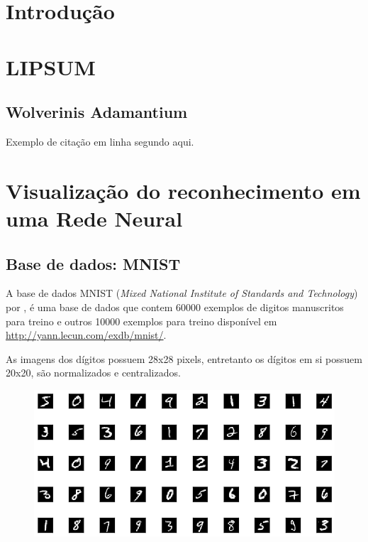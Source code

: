 \documentclass[
	12pt,				%
	oneside,			%
	a4paper,			%
	english,			%
	french,				%
	spanish,			%
	brazil,				%
	]{abntex2}
\begin{document}
\chapter[Introdução]{Introdução}

\par \lipsum[50]

\chapter{LIPSUM}
\section{Wolverinis Adamantium}
\par \lipsum[30] \cite{deeplearning_net_mlp}

\par Exemplo de citação em linha segundo  aqui.

\chapter{Visualização do reconhecimento em uma Rede Neural}
\section{Base de dados: MNIST}

\par A base de dados MNIST (\textit{Mixed National Institute of Standards and Technology}) por , é uma base de dados que contem 60000 exemplos de digitos manuscritos para treino e outros 10000 exemplos para treino disponível em \url{http://yann.lecun.com/exdb/mnist/}.

\par As imagens dos dígitos possuem 28x28 pixels, entretanto os dígitos em si possuem 20x20, são normalizados e centralizados.

\begin{figure}
	\centering
	\includegraphics[width=0.7\linewidth]{images/fabio/inputs}
	\caption[Exemplos dos 50 primeiros digítos disponíveis na base de dados do MNIST.]{}
	\caption{}
	\label{fig:inputs}
\end{figure}
\end{document}
